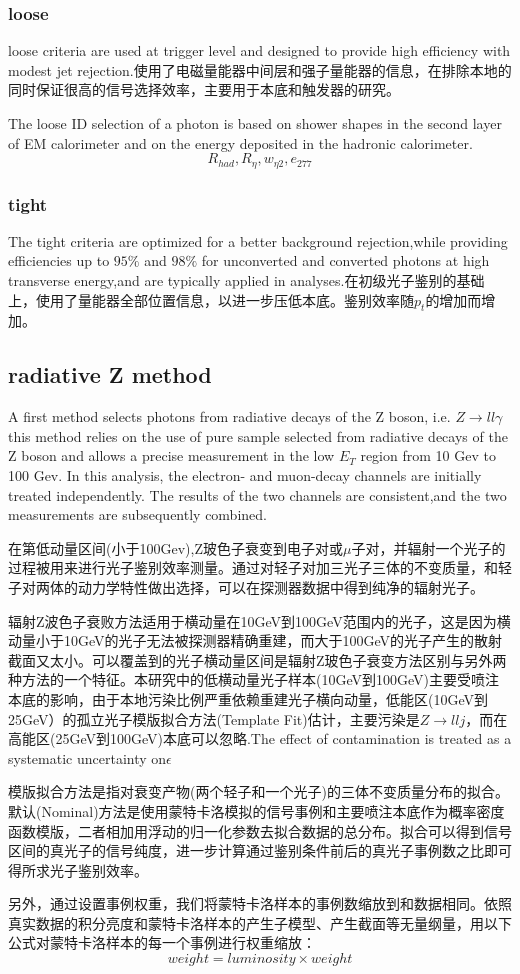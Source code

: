 \documentclass{ctexart}
\begin{document}
\subsubsection{loose}
loose criteria are used at trigger level and designed to provide  high efficiency with modest jet rejection.使用了电磁量能器中间层和强子量能器的信息，在排除本地的同时保证很高的信号选择效率，主要用于本底和触发器的研究。\par
The loose ID selection of a photon is based on shower shapes in the second layer of EM calorimeter and on the energy deposited in the  hadronic calorimeter.\\
$$R_{had},R_\eta,w_{\eta 2},e_{277}$$
\subsubsection{tight}
The tight criteria are optimized for a better background rejection,while providing efficiencies up to $95\%$  and $98\%$ for unconverted and converted photons at high transverse energy,and are typically applied in analyses.在初级光子鉴别的基础上，使用了量能器全部位置信息，以进一步压低本底。鉴别效率随$p_t$的增加而增加。
\subsection{radiative Z method}
A first method selects photons from radiative decays
of the Z boson, i.e. $Z\rightarrow ll\gamma$ this method relies on the use of pure sample selected from radiative decays of the Z  boson and allows a precise measurement in the low $E_T$ region from 10 Gev to 100 Gev. In this analysis, the electron- and muon-decay channels are initially treated independently. The results of the two channels are consistent,and the two measurements are subsequently combined.\par
在第低动量区间(小于100Gev),Z玻色子衰变到电子对或$\mu$子对，并辐射一个光子的过程被用来进行光子鉴别效率测量。通过对轻子对加三光子三体的不变质量，和轻子对两体的动力学特性做出选择，可以在探测器数据中得到纯净的辐射光子。\par
辐射Z波色子衰败方法适用于横动量在10GeV到100GeV范围内的光子，这是因为横动量小于10GeV的光子无法被探测器精确重建，而大于100GeV的光子产生的散射截面又太小。可以覆盖到的光子横动量区间是辐射Z玻色子衰变方法区别与另外两种方法的一个特征。本研究中的低横动量光子样本(10GeV到100GeV)主要受喷注本底的影响，由于本地污染比例严重依赖重建光子横向动量，低能区(10GeV到25GeV）的孤立光子模版拟合方法(Template Fit)估计，主要污染是$Z\rightarrow llj$，而在高能区(25GeV到100GeV)本底可以忽略.The effect of contamination is treated as  a systematic uncertainty on$\epsilon$\par
模版拟合方法是指对衰变产物(两个轻子和一个光子)的三体不变质量分布的拟合。默认(Nominal)方法是使用蒙特卡洛模拟的信号事例和主要喷注本底作为概率密度函数模版，二者相加用浮动的归一化参数去拟合数据的总分布。拟合可以得到信号区间的真光子的信号纯度，进一步计算通过鉴别条件前后的真光子事例数之比即可得所求光子鉴别效率。\par
另外，通过设置事例权重，我们将蒙特卡洛样本的事例数缩放到和数据相同。依照真实数据的积分亮度和蒙特卡洛样本的产生子模型、产生截面等无量纲量，用以下公式对蒙特卡洛样本的每一个事例进行权重缩放：
$$weight=luminosity\times weight$$
\end{document}
